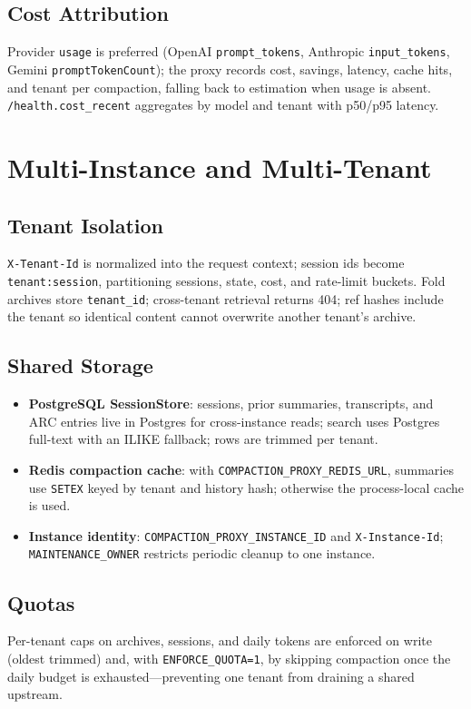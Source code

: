 \documentclass[11pt,a4paper]{article}
\begin{document}
\subsection{Cost Attribution}
Provider \texttt{usage} is preferred (OpenAI \texttt{prompt\_tokens}, Anthropic \texttt{input\_tokens}, Gemini \texttt{promptTokenCount}); the proxy records cost, savings, latency, cache hits, and tenant per compaction, falling back to estimation when usage is absent. \texttt{/health.cost\_recent} aggregates by model and tenant with p50/p95 latency.

\section{Multi-Instance and Multi-Tenant}

\subsection{Tenant Isolation}
\texttt{X-Tenant-Id} is normalized into the request context; session ids become \texttt{tenant:session}, partitioning sessions, state, cost, and rate-limit buckets. Fold archives store \texttt{tenant\_id}; cross-tenant retrieval returns 404; ref hashes include the tenant so identical content cannot overwrite another tenant's archive.

\subsection{Shared Storage}
\begin{itemize}
  \item \textbf{PostgreSQL SessionStore}: sessions, prior summaries, transcripts, and ARC entries live in Postgres for cross-instance reads; search uses Postgres full-text with an ILIKE fallback; rows are trimmed per tenant.
  \item \textbf{Redis compaction cache}: with \texttt{COMPACTION\_PROXY\_REDIS\_URL}, summaries use \texttt{SETEX} keyed by tenant and history hash; otherwise the process-local cache is used.
  \item \textbf{Instance identity}: \texttt{COMPACTION\_PROXY\_INSTANCE\_ID} and \texttt{X-Instance-Id}; \texttt{MAINTENANCE\_OWNER} restricts periodic cleanup to one instance.
\end{itemize}

\subsection{Quotas}
Per-tenant caps on archives, sessions, and daily tokens are enforced on write (oldest trimmed) and, with \texttt{ENFORCE\_QUOTA=1}, by skipping compaction once the daily budget is exhausted---preventing one tenant from draining a shared upstream.
\end{document}
